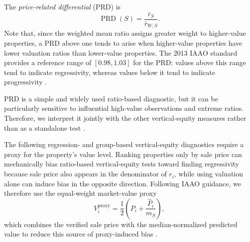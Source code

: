 \documentclass[10pt]{article}
\theoremstyle{definition}
\newcommand{\1}{\mathbf{1}}
\begin{document}
The \emph{price-related differential} (PRD) is
\begin{equation}
\label{eq:prd}
\operatorname{PRD}(S)
=
\frac{\bar r_S}{\bar r_{W,S}}.
\end{equation}
Note that, since the weighted mean ratio assigns greater weight to higher-value properties, a PRD above one tends to arise when higher-value properties have lower valuation ratios than lower-value properties. The 2013 IAAO standard provides a reference range of $[0.98,1.03]$ for the PRD: values above this range tend to indicate regressivity, whereas values below it tend to indicate progressivity \cite{IAAO2013Ratio}.

{PRD is a simple and widely used ratio-based diagnostic, but it can be particularly sensitive to influential high-value observations and extreme ratios. Therefore, we interpret it jointly with the other vertical-equity measures rather than as a standalone test \cite{IAAO2026ExposureRatio}.}


{The following regression- and group-based vertical-equity diagnostics require a proxy for the property's value level. Ranking properties only by sale price can mechanically bias ratio-based vertical-equity tests toward finding regressivity because sale price also appears in the denominator of $r_i$, while using valuation alone can induce bias in the opposite direction. Following IAAO guidance, we therefore use the equal-weight market-value proxy}
\begin{equation}
\label{eq:market_value_proxy}
V_i^{\mathrm{proxy}}
=
\frac{1}{2}
\left(
P_i+\frac{\widehat P_i}{m_S}
\right),
\end{equation}
{which combines the verified sale price with the median-normalized predicted value to reduce this source of proxy-induced bias \cite{IAAO2013Ratio,IAAO2026ExposureRatio}.}

\end{document}

